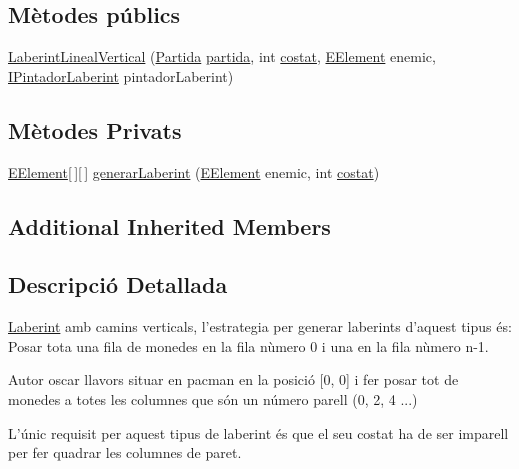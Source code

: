\subsection*{Mètodes públics}
\begin{DoxyCompactItemize}
\item 
\hyperlink{classlogica_1_1laberints_1_1_laberint_lineal_vertical_a98a5be8e42c30d6f6ad03e5c1e635c4b}{Laberint\+Lineal\+Vertical} (\hyperlink{classlogica_1_1_partida}{Partida} \hyperlink{classlogica_1_1laberints_1_1_laberint_a7183ce070714f73e078bb36e8c21b575}{partida}, int \hyperlink{classlogica_1_1laberints_1_1_laberint_ae874ac4889592b811709f5b967d85286}{costat}, \hyperlink{enumlogica_1_1enumeracions_1_1_e_element}{E\+Element} enemic, \hyperlink{interfaceinterficie_1_1_i_pintador_laberint}{I\+Pintador\+Laberint} pintador\+Laberint)
\end{DoxyCompactItemize}
\subsection*{Mètodes Privats}
\begin{DoxyCompactItemize}
\item 
\hyperlink{enumlogica_1_1enumeracions_1_1_e_element}{E\+Element}\mbox{[}$\,$\mbox{]}\mbox{[}$\,$\mbox{]} \hyperlink{classlogica_1_1laberints_1_1_laberint_lineal_vertical_a866046523691d72367ba28ec8bb83bbc}{generar\+Laberint} (\hyperlink{enumlogica_1_1enumeracions_1_1_e_element}{E\+Element} enemic, int \hyperlink{classlogica_1_1laberints_1_1_laberint_ae874ac4889592b811709f5b967d85286}{costat})
\end{DoxyCompactItemize}
\subsection*{Additional Inherited Members}


\subsection{Descripció Detallada}
\hyperlink{classlogica_1_1laberints_1_1_laberint}{Laberint} amb camins verticals, l'estrategia per generar laberints d'aquest tipus és\+: Posar tota una fila de monedes en la fila nùmero 0 i una en la fila nùmero n-\/1. 

\begin{DoxyAuthor}{Autor}
oscar llavors situar en pacman en la posició \mbox{[}0, 0\mbox{]} i fer posar tot de monedes a totes les columnes que són un número parell (0, 2, 4 ...)
\end{DoxyAuthor}
L'únic requisit per aquest tipus de laberint és que el seu costat ha de ser imparell per fer quadrar les columnes de paret.

